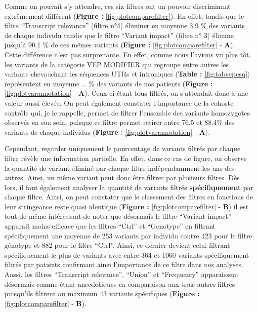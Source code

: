 \documentclass[12pt,twoside]{reedthesis}
\theoremstyle{definition}
\theoremstyle{definition}
\theoremstyle{remark}
\begin{document}
  \newpage
  
  \newpage
  
  Comme on pouvait s'y attendre, ces six filtres ont un pouvoir
  discriminant extrêmement différent (\textbf{Figure :}
  \ref{fig:plotcomparefilter}). En effet, tandis que le filtre
  ``Transcript relevance'' (filtre n°4) éliminer en moyenne 3.9 \% des
  variants de chaque individu tandis que le filtre ``Variant impact''
  (filtre n° 3) élimine jusqu'à 90.1 \% de ces mêmes variants
  (\textbf{Figure :} \ref{fig:plotcomparefilter} - \textbf{A}). Cette
  différence n'est pas surprenante. En effet, comme nous l'avions vu plus
  tôt, les variants de la catégorie VEP MODIFIER qui regroupe entre autres
  les variants chevauchant les séquences UTRs et introniques
  (\textbf{Table :} \ref{fig:tabvepcsq}) représentent en moyenne \ldots{}
  \% des variants de nos patients (\textbf{Figure :}
  \ref{fig:plotvarannotation} - \textbf{A}). Ceux-ci étant tous filtrés,
  on s'attendait donc à une valeur aussi élevée. On peut également
  constater l'importance de la cohorte contrôle qui, je le rappelle,
  permet de filtrer l'ensemble des variants homozygotes observés en son
  sein, puisque ce filtre permet retirer entre 76.5 et 88.4\% des variants
  de chaque individus (\textbf{Figure :} \ref{fig:plotvarannotation} -
  \textbf{A}).
  
  Cependant, regarder uniquement le pourcentage de variants filtrés par
  chaque filtre révèle une information partielle. En effet, dans ce cas de
  figure, on observe la quantité de variant éliminé par chaque filtre
  indépendamment les uns des autres. Ainsi, un même variant peut donc être
  filtrer par plusieurs filtres. Dès lors, il faut également analyser la
  quantité de variants filtrés \textbf{spécifiquement} par chaque filtre.
  Ainsi, on peut constater que le classement des filtres en fonctions de
  leur stringeance reste quasi identique (\textbf{Figure :}
  \ref{fig:plotcomparefilter} - \textbf{B}) il est tout de même
  intéressant de noter que désormais le filtre ``Variant impact'' apparait
  moins efficace que les filtres ``Ctrl'' et ``Genotype'' en filtrant
  spécifiquement une moyenne de 253 variants par individu contre 423 pour
  le filtre génotype et 882 pour le filtre ``Ctrl''. Ainsi, ce dernier
  devient celui filtrant spécifiquement le plus de variants avec entre 364
  et 1060 variants spécifiquement filtrés par patients confirmant ainsi
  l'importance de ce filtre dans nos analyses. Aussi, les filtres
  ``Transcript relevance'', ``Union'' et ``Frequency'' apparaissent
  désormais comme étant anecdotiques en comparaison aux trois autres
  filtres puisqu'ils filtrent au maximum 43 variants spécifiques
  (\textbf{Figure :} \ref{fig:plotcomparefilter} - \textbf{B}).
  
\end{document}
